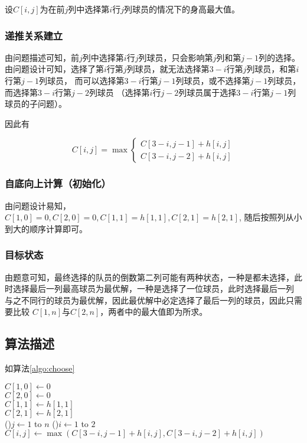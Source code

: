 设$C[i,j]$为在前$j$列中选择第$i$行$j$列球员的情况下的身高最大值。

\subsubsection{递推关系建立}

由问题描述可知，前$j$列中选择第$i$行$j$列球员，只会影响第$j$列和第$j-1$列的选择。
由问题设计可知，选择了第$i$行第$j$列球员，就无法选择第$3-i$行第$j$列球员，和第$i$行第$j-1$列球员，
而可以选择第$3-i$行第$j-1$列球员，或不选择第$j-1$列球员，而选择第$3-i$行第$j-2$列球员
（选择第$i$行$j-2$列球员属于选择$3-i$行第$j-1$列球员的子问题）。

因此有

\begin{equation}
    C[i,j] = \max
    \left \{
        \begin{aligned}
            C[3-i,j-1] + h[i,j]\\
            C[3-i,j-2] + h[i,j]
        \end{aligned}
     \right .   
\end{equation}

\subsubsection{自底向上计算（初始化）}

由问题设计易知，$ C[1,0] = 0, C[2,0] = 0, C[1,1] = h[1,1], C[2, 1] = h[2,1] $,
随后按照列从小到大的顺序计算即可。

\subsubsection{目标状态}
由题意可知，最终选择的队员的倒数第二列可能有两种状态，一种是都未选择，此时选择最后一列最高球员为最优解，一种是选择了一位球员，此时选择最后一列
与之不同行的球员为最优解，因此最优解中必定选择了最后一列的球员，因此只需要比较 $C[1,n]$与$C[2,n]$，两者中的最大值即为所求。

\subsection{算法描述}

如算法\ref{algo:choose}

\begin{algorithm}[H]
    \caption{$choose(h[1..2,1..n])$}\label{algo:choose}
    
    $C[1,0] \leftarrow 0$\\
    $C[2,0] \leftarrow 0$\\
    $C[1,1] \leftarrow h[1,1]$\\
    $C[2,1] \leftarrow h[2,1]$\\

    \For(){$j \leftarrow 1$ to $n$ }{
        \For(){$i \leftarrow 1$ to $2$}{
            $C[i,j] \leftarrow \max(C[3-i,j-1] + h[i,j] , C[3-i,j-2] + h[i,j])$\\
        }
    }
\end{algorithm}

